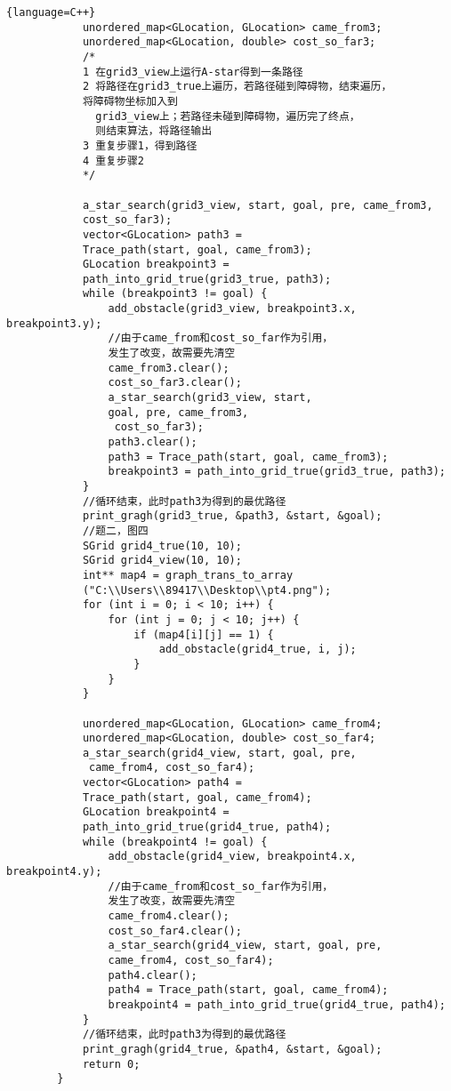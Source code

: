 \documentclass[withoutpreface,bwprint]{cumcmthesis} %
\begin{document}
\begin{appendix}
\begin{lstlisting}{language=C++}
            unordered_map<GLocation, GLocation> came_from3;
            unordered_map<GLocation, double> cost_so_far3;
            /*
            1 在grid3_view上运行A-star得到一条路径
            2 将路径在grid3_true上遍历，若路径碰到障碍物，结束遍历，
            将障碍物坐标加入到
              grid3_view上；若路径未碰到障碍物，遍历完了终点，
              则结束算法，将路径输出
            3 重复步骤1，得到路径
            4 重复步骤2
            */
        
            a_star_search(grid3_view, start, goal, pre, came_from3, 
            cost_so_far3);
            vector<GLocation> path3 = 
            Trace_path(start, goal, came_from3);
            GLocation breakpoint3 = 
            path_into_grid_true(grid3_true, path3);
            while (breakpoint3 != goal) {
                add_obstacle(grid3_view, breakpoint3.x, breakpoint3.y);
                //由于came_from和cost_so_far作为引用，
                发生了改变，故需要先清空
                came_from3.clear();
                cost_so_far3.clear();
                a_star_search(grid3_view, start, 
                goal, pre, came_from3,
                 cost_so_far3);
                path3.clear();
                path3 = Trace_path(start, goal, came_from3);
                breakpoint3 = path_into_grid_true(grid3_true, path3);
            }
            //循环结束，此时path3为得到的最优路径
            print_gragh(grid3_true, &path3, &start, &goal);
            //题二，图四
            SGrid grid4_true(10, 10);
            SGrid grid4_view(10, 10);
            int** map4 = graph_trans_to_array
            ("C:\\Users\\89417\\Desktop\\pt4.png");
            for (int i = 0; i < 10; i++) {
                for (int j = 0; j < 10; j++) {
                    if (map4[i][j] == 1) {
                        add_obstacle(grid4_true, i, j);
                    }
                }
            }
        
            unordered_map<GLocation, GLocation> came_from4;
            unordered_map<GLocation, double> cost_so_far4;
            a_star_search(grid4_view, start, goal, pre,
             came_from4, cost_so_far4);
            vector<GLocation> path4 = 
            Trace_path(start, goal, came_from4);
            GLocation breakpoint4 = 
            path_into_grid_true(grid4_true, path4);
            while (breakpoint4 != goal) {
                add_obstacle(grid4_view, breakpoint4.x, breakpoint4.y);
                //由于came_from和cost_so_far作为引用，
                发生了改变，故需要先清空
                came_from4.clear();
                cost_so_far4.clear();
                a_star_search(grid4_view, start, goal, pre, 
                came_from4, cost_so_far4);
                path4.clear();
                path4 = Trace_path(start, goal, came_from4);
                breakpoint4 = path_into_grid_true(grid4_true, path4);
            }
            //循环结束，此时path3为得到的最优路径
            print_gragh(grid4_true, &path4, &start, &goal);
            return 0;
        }
    \end{lstlisting}
\end{appendix}
\end{document}

